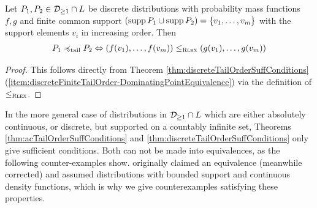 \documentclass[a4paper]{scrreprt}
\begin{document}
    \begin{cor}
        Let $P_1, P_2 \in \mathcal{D}_{\geq1} \cap L$ be discrete distributions with probability mass functions $f, g$ and finite common support $(\operatorname{supp} P_1 \cup \operatorname{supp} P_2) = \{v_1, \dots, v_m\}$ with the support elements $v_i$ in increasing order. Then
        \begin{gather}            
            P_1 \preccurlyeq_{\text{tail}} P_2 \Leftrightarrow (f(v_1), \dots, f(v_m)) \leq_{\textsc{Rlex}} (g(v_1), \dots, g(v_m))
            \label{eq:discreteFiniteTailOrder-RLexEquivalence}
        \end{gather}
        \label{cor:discreteFiniteTailOrder-RLexEquivalence}
    \end{cor}
    \vspace{-1.2cm}
    \begin{proof}
        This follows directly from Theorem \ref{thm:discreteTailOrderSuffConditions} (\ref{item:discreteFiniteTailOrder-DominatingPointEquivalence}) via the definition of $\leq_{\textsc{Rlex}}$.
    \end{proof}    
    In the more general case of distributions in $\mathcal{D}_{\geq1} \cap L$ which are either absolutely continuous, or discrete, but supported on a countably infinite set, Theorems \ref{thm:acTailOrderSuffConditions} and \ref{thm:discreteTailOrderSuffConditions} only give sufficient conditions.
    Both can not be made into equivalences, as the following counter-examples show. \cite{bib:rassGameRiskManagI} originally claimed an equivalence (meanwhile corrected) and assumed distributions with bounded support and continuous density functions, which is why we give counterexamples satisfying these properties.
\end{document}
